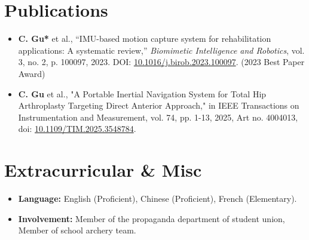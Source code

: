 \documentclass[letterpaper,10pt]{article}
\newcommand{\resumeItem}[1]{
  \item\small{
    {#1 \vspace{-4pt}}
  }
}
\newcommand{\resumeItemListStart}{\begin{itemize}}
\newcommand{\resumeItemListEnd}{\end{itemize}\vspace{-5pt}}
\begin{document}
\section{Publications}
\resumeItemListStart
\resumeItem{
  \textbf{C.
    Gu*} et al., “IMU-based motion capture system for rehabilitation applications: A systematic
  review,” \textit{Biomimetic Intelligence and Robotics}, vol.
  3, no. 2, p. 100097, 2023.
  DOI: \href{https://doi.org/10.1016/j.birob.2023.100097}{10.1016/j.birob.2023.100097}.
  (2023 Best Paper Award)
}
\resumeItem{
  \textbf{C.
    Gu} et al., "A Portable Inertial Navigation System for Total Hip Arthroplasty Targeting Direct
  Anterior Approach," in IEEE Transactions on Instrumentation and Measurement, vol.
  74, pp. 1-13, 2025, Art no. 4004013, doi: \href{https://doi.org/10.1109/TIM.2025.3548784}{10.1109/TIM.2025.3548784}.
}
\resumeItemListEnd

\vspace{-8pt}
\section{Extracurricular \& Misc}
\resumeItemListStart
\resumeItem{\textbf{Language:}
  English (Proficient), Chinese (Proficient), French (Elementary).
}
\resumeItem{\textbf{Involvement:}
  Member of the propaganda department of student union, Member of school archery team.
}
\resumeItemListEnd
\end{document}
